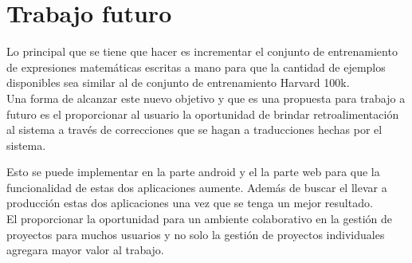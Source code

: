\chapter{Trabajo futuro}

Lo principal que se tiene que hacer es incrementar el conjunto de entrenamiento de expresiones matemáticas escritas a mano para que la cantidad de ejemplos disponibles sea similar al de conjunto de entrenamiento Harvard 100k. \\

Una forma de alcanzar este nuevo objetivo y que es una propuesta para trabajo a futuro es el proporcionar al usuario la oportunidad de brindar retroalimentación al sistema a través de correcciones que se hagan a traducciones hechas por el sistema.

Esto se puede implementar en la parte android y el la parte web para que la funcionalidad de estas dos aplicaciones aumente.  Además de buscar el llevar a producción estas dos aplicaciones una vez que se tenga un mejor resultado.\\

El proporcionar la oportunidad para un ambiente colaborativo en la gestión de proyectos para muchos usuarios y no solo la gestión de proyectos individuales agregara mayor valor al trabajo.
